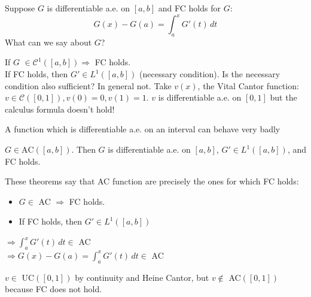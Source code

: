 Suppose \(G\) is differentiable a.e. on \(\left[a, b\right]\) and FC holds for \(G\):
\[
    G(x) - G(a) = \int_a^x G'(t) \, dt
\]
What can we say about \(G\)?
\begin{remark}
    If \(G\) \(\in \mathcal{C}^1(\left[a, b\right]) \Rightarrow\) FC holds. \\
    If FC holds, then \(G' \in L^1(\left[a, b\right]) \) (necessary condition).
    \noindent
    Is the necessary condition also sufficient? In general not. 
    Take \(v(x)\), the Vital Cantor function: \(v \in \mathcal{C}([0,1]), v(0)=0, v(1)=1\). \(v\) is differentiable a.e. on \([0,1]\) but the calculus formula doesn't hold!
\end{remark}
\begin{remark}
    A function which is differentiable a.e. on an interval can behave very badly
\end{remark}
\begin{theorem}
    \(G \in \text{AC}([a, b])\). Then \(G\) is differentiable a.e. on \([a, b]\), \(G' \in L^1([a, b])\), and FC holds.
\end{theorem}
\begin{remark}
    These theorems say that AC function are precisely the ones for which FC holds:
    \begin{itemize}
        \item \(G \in \) AC \(\Rightarrow\) FC holds. 
        \item If FC holds, then \(G' \in L^1 ([a, b])\) 
    \end{itemize}
    \(\Rightarrow \int_a^x G'(t) \, dt \in \) AC \\
    \(\Rightarrow G(x) - G(a) = \int_a^x G'(t) \, dt \in \) AC   
\end{remark}
\begin{remark}
    \(v \in \) UC\(([0, 1])\) by continuity and Heine Cantor, but \(v \notin \) AC\(([0, 1])\) because FC does not hold.
\end{remark}

